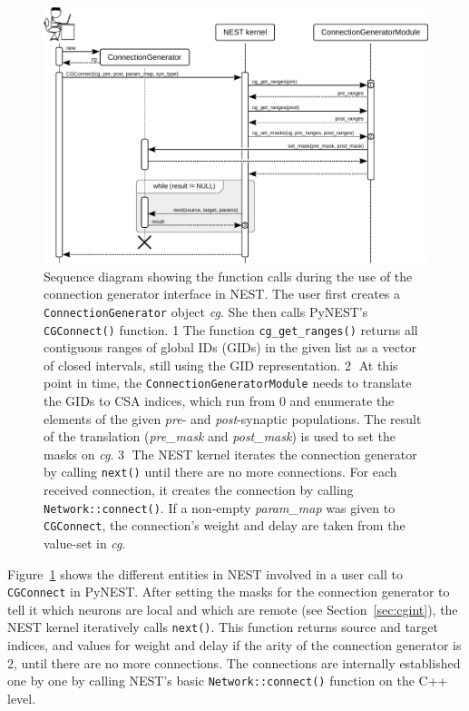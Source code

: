 \documentclass{frontiersSCNS} %
\newcommand{\INLINEFIGS}{} %
\newcommand{\Figure}[2]{Figure~\ref{#2}}
\newcommand{\Figure}[2]{Figure~#1}
\begin{document}
\ifdefined\INLINEFIGS
\begin{figure}[ht]
\centering
\includegraphics[scale=.8]{figures/sequence_diagram_nest.pdf}
\caption{Sequence diagram showing the function calls during the use of
  the connection generator interface in NEST. The user first creates a
  \texttt{ConnectionGenerator} object \emph{cg}. She then calls
  PyNEST's \texttt{CGConnect()} function. \textcircled{\footnotesize
    1} The function \texttt{cg\_get\_ranges()} returns all contiguous
  ranges of global IDs (GIDs) in the given list as a vector of closed
  intervals, still using the GID representation.
  \textcircled{\footnotesize 2} At this point in time, the
  \texttt{ConnectionGeneratorModule} needs to translate the GIDs to
  CSA indices, which run from 0 and enumerate the elements of the
  given \emph{pre}- and \emph{post}-synaptic populations. The result
  of the translation (\emph{pre\_mask} and \emph{post\_mask}) is used
  to set the masks on \emph{cg}. \textcircled{\footnotesize 3} The
  NEST kernel iterates the connection generator by calling
  \texttt{next()} until there are no more connections. For each
  received connection, it creates the connection by calling
  \texttt{Network::connect()}. If a non-empty \emph{param\_map} was
  given to \texttt{CGConnect}, the connection's weight and delay are
  taken from the value-set in
  \emph{cg}.}\label{fig:sequence_diagram_nest}
\end{figure}
\fi

\Figure{3}{fig:sequence_diagram_nest} shows the different entities in
NEST involved in a user call to \verb|CGConnect| in PyNEST. After
setting the masks for the connection generator to tell it which
neurons are local and which are remote (see Section~\ref{sec:cgint}),
the NEST kernel iteratively calls \verb|next()|. This function returns
source and target indices, and values for weight and delay if the
arity of the connection generator is 2, until there are no more
connections. The connections are internally established one by one by
calling NEST's basic \verb|Network::connect()| function on the C++
level.
\end{document}
